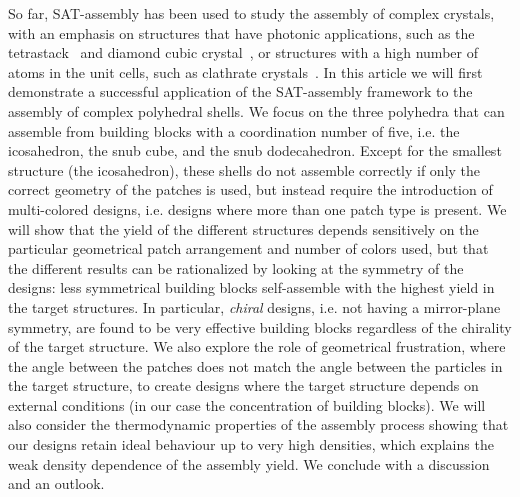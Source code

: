 \documentclass[a4paper, amsfonts, amssymb, amsmath, reprint, showkeys, nofootinbib, oneside]{revtex4-1}
\begin{document}
So far, SAT-assembly has been used to study the assembly of complex crystals, with an emphasis on structures that have photonic applications, such as the tetrastack~\cite{Romano2020a} and diamond cubic crystal~\textcolor{blue}{\cite{Romano2020a,Russo2022,rovigatti2022simple}}, or structures with a high number of atoms in the unit cells, such as clathrate crystals~\cite{Romano2020a}. In this article we will first demonstrate a successful application of the SAT-assembly framework to the assembly of complex polyhedral shells. We focus on the three polyhedra that can assemble from building blocks with a  coordination number of five, i.e. the icosahedron, the snub cube, and the snub dodecahedron. Except for the smallest structure (the icosahedron), these shells do not assemble correctly if only the correct geometry of the patches is used, but instead require the introduction of multi-colored designs, i.e. designs where more than one patch type is present. We will show that the yield of the different structures depends sensitively on the particular geometrical patch arrangement and number of colors used, but that the different results can be rationalized by looking at the symmetry of the designs: less symmetrical building blocks self-assemble with the highest yield in the target structures. In particular, \emph{chiral} designs, i.e. not having a mirror-plane symmetry, are found to be very effective building blocks regardless of the chirality of the target structure. We also explore the role of geometrical frustration, where the angle between the patches does not match the angle between the particles in the target structure, to create designs where the target structure depends on external conditions (in our case the concentration of building blocks). We will also consider the thermodynamic properties of the assembly process showing that our designs retain ideal behaviour up to very high densities, which explains the weak density dependence of the assembly yield. We conclude with a discussion and an outlook.



\end{document}
